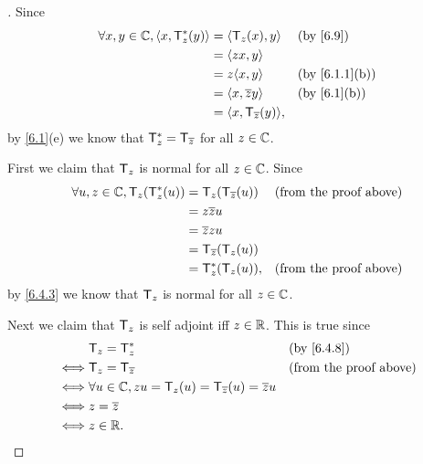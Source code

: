 \begin{proof}[]
  Since
  \begin{align*}
    \forall x, y \in \C, \inn{x, \T_z^*(y)} & = \inn{\T_z(x), y}           &  & \by{6.9}      \\
                                            & = \inn{zx, y}                                   \\
                                            & = z \inn{x, y}               &  & \by{6.1.1}[b] \\
                                            & = \inn{x, \conj{z} y}        &  & \by{6.1}[b]   \\
                                            & = \inn{x, \T_{\conj{z}}(y)},
  \end{align*}
  by \cref{6.1}(e) we know that \(\mathsf{T}_z^* = \mathsf{T}_{\overline{z}}\) for all \(z \in \mathbb{C}\).

  First we claim that \(\mathsf{T}_z\) is normal for all \(z \in \mathbb{C}\).
  Since
  \begin{align*}
    \forall u, z \in \mathbb{C}, \mathsf{T}_z(\mathsf{T}_z^*(u)) & = \mathsf{T}_z(\mathsf{T}_{\overline{z}}(u)) &  & \text{(from the proof above)} \\
                                         & = z \overline{z} u                                              \\
                                         & = \overline{z} z u                                              \\
                                         & = \mathsf{T}_{\overline{z}}(\mathsf{T}_z(u))                                    \\
                                         & = \mathsf{T}_z^*(\mathsf{T}_z(u)),       &  & \text{(from the proof above)}
  \end{align*}
  by \cref{6.4.3} we know that \(\mathsf{T}_z\) is normal for all \(z \in \mathbb{C}\).

  Next we claim that \(\mathsf{T}_z\) is self adjoint iff \(z \in \mathbb{R}\).
  This is true since
  \begin{align*}
         & \T_z = \T_z^*                                                  &  & \by{6.4.8}                    \\
    \iff & \T_z = \T_{\conj{z}}                                           &  & \text{(from the proof above)} \\
    \iff & \forall u \in \C, zu = \T_z(u) = \T_{\conj{z}}(u) = \conj{z} u                                    \\
    \iff & z = \conj{z}                                                                                      \\
    \iff & z \in \R.
  \end{align*}


\end{proof}
